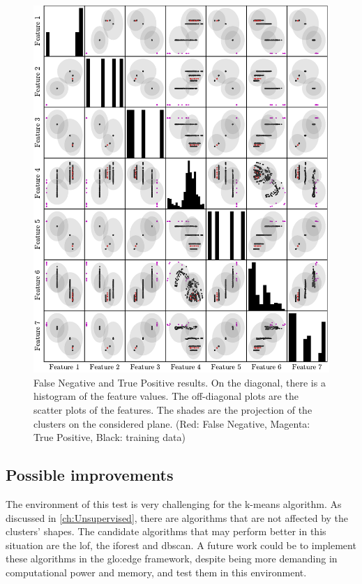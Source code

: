 \begin{figure}
    \centering
    \includegraphics{Images/shaker/ConfusionMatrix.pdf}
    \caption{False Negative and True Positive results. On the diagonal, there is a histogram of the feature values. The off-diagonal plots are the scatter plots of the features. The shades are the projection of the clusters on the considered plane. (Red: False Negative, Magenta: True Positive, Black: training data)}
    \label{fig:shaker_conf_matrix}
\end{figure}

\subsection{Possible improvements}
The environment of this test is very challenging for the k-means algorithm. As discussed in \autoref{ch:Unsupervised}, there are algorithms that are not affected by the clusters' shapes. The candidate algorithms that may perform better in this situation are the \gls{lof}, the \gls{iforest} and \gls{dbscan}. A future work could be to implement these algorithms in the \gls{glo:edge} framework, despite being more demanding in computational power and memory, and test them in this environment.

